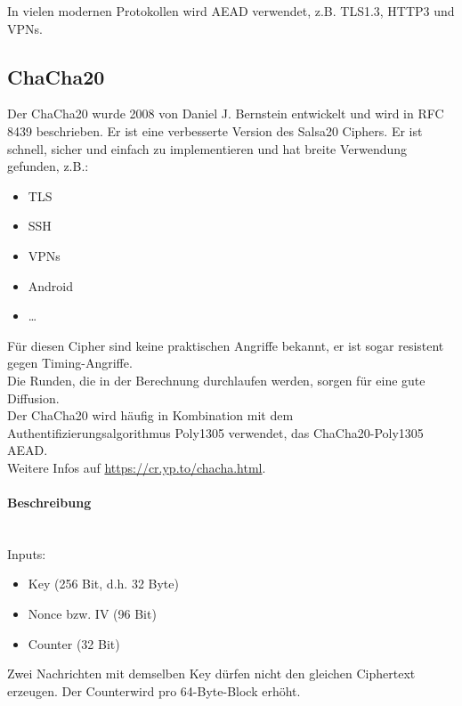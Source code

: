\noindent In vielen modernen Protokollen wird AEAD verwendet, z.B. TLS1.3, HTTP3 und VPNs.

\subsection{ChaCha20}

Der ChaCha20 wurde 2008 von Daniel J. Bernstein entwickelt und wird in RFC 8439 beschrieben. Er ist eine verbesserte Version des Salsa20 Ciphers.
Er ist schnell, sicher und einfach zu implementieren und hat breite Verwendung gefunden, z.B.: 

\begin{itemize}
    \item TLS
    \item SSH 
    \item VPNs 
    \item Android 
    \item \ldots
\end{itemize}

\noindent Für diesen Cipher sind keine praktischen Angriffe bekannt, er ist sogar resistent gegen Timing-Angriffe.\\

\noindent Die Runden, die in der Berechnung durchlaufen werden, sorgen für eine gute Diffusion. \\

\noindent Der ChaCha20 wird häufig in Kombination mit dem Authentifizierungsalgorithmus Poly1305  verwendet, das ChaCha20-Poly1305 AEAD. \\

\noindent Weitere Infos auf \url{https://cr.yp.to/chacha.html}.

\paragraph{Beschreibung} \mbox{} \\

Inputs:
\begin{itemize}
    \item Key (256 Bit, d.h. 32 Byte)
    \item Nonce bzw. IV (96 Bit)
    \item Counter (32 Bit)
\end{itemize}

\noindent Zwei Nachrichten mit demselben Key dürfen nicht den gleichen Ciphertext erzeugen. Der Counterwird pro 64-Byte-Block erhöht. \\

